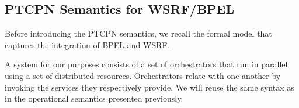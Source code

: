 


\subsection*{PTCPN Semantics for WSRF/BPEL}

Before introducing the PTCPN semantics, we 
recall the formal model that 
captures the integration of BPEL and WSRF.

A system for our purposes consists of a set of orchestrators
that run in parallel using a set of distributed resources.
Orchestrators relate with one another by
invoking the services they respectively provide. We will reuse the same syntax as in the operational semantics presented previously.



